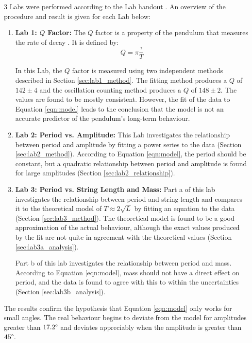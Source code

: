 \documentclass[aps,twocolumn,secnumarabic,nobalancelastpage,amsmath,amssymb,nofootinbib,floatfix,letterpaper]{revtex4}
\begin{document}
3 Labs were performed according to the Lab handout \cite{lab}. An overview of the procedure and result is given for each
Lab below:
\begin{enumerate}
    \item
    \textbf{Lab 1: \(Q\) Factor:}
    The \(Q\) factor is a property of the pendulum that measures the rate of decay \cite{lab}. It is defined by:
    \begin{equation}
        Q = \pi\frac{\tau}{T}
        \label{eqn:qfactor}
    \end{equation}

    In this Lab, the \(Q\) factor is measured using two independent methods described in Section \ref{sec:lab1_method}.
    The fitting method produces a \(Q\) of \(142 \pm 4\) and the oscillation counting method produces a \(Q\) of
    \(148 \pm 2\). The values are found to be mostly consistent. However, the fit of the data to Equation \ref{eqn:model}
    leads to the conclusion that the model is not an accurate predictor of the pendulum's long-term behaviour.

    \item
    \textbf{Lab 2: Period vs. Amplitude:}
    This Lab investigates the relationship between period and amplitude by fitting a power series to the data (Section
    \ref{sec:lab2_method}).
    According to Equation \ref{eqn:model}, the period should be constant, but a quadratic relationship between period and
    amplitude is found for large amplitudes (Section \ref{sec:lab2_relationship}).

    \item
    \textbf{Lab 3: Period vs. String Length and Mass:}
    Part a of this lab investigates the relationship between period and string length and compares it to the theoretical
    model of \(T \approx 2\sqrt{L}\) \cite{lab} by fitting an equation to the data (Section \ref{sec:lab3_method}).
    The theoretical model is found to be a good approximation of the actual behaviour, although the exact values
    produced by the fit are not quite in agreement with the theoretical values (Section \ref{sec:lab3a_analysis}).

    Part b of this lab investigates the relationship between period and mass. According to Equation \ref{eqn:model},
    mass should not have a direct effect on period, and the data is found to agree with this to within the uncertainties
    (Section \ref{sec:lab3b_analysis}).
\end{enumerate}

The results confirm the hypothesis that Equation \ref{eqn:model} only works for small angles. The real behaviour begins to
deviate from the model for amplitudes greater than \(17.2\degree\) and deviates appreciably when the amplitude is
greater than \(45\degree\).
\end{document}
